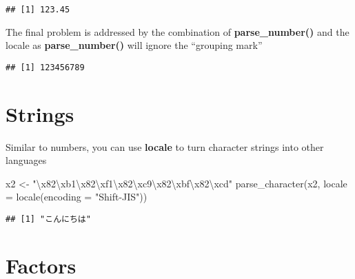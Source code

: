 \documentclass[
]{article}
\newenvironment{Shaded}{\begin{snugshade}}{\end{snugshade}}
\newcommand{\AttributeTok}[1]{\textcolor[rgb]{0.77,0.63,0.00}{#1}}
\newcommand{\FunctionTok}[1]{\textcolor[rgb]{0.00,0.00,0.00}{#1}}
\newcommand{\NormalTok}[1]{#1}
\newcommand{\OtherTok}[1]{\textcolor[rgb]{0.56,0.35,0.01}{#1}}
\newcommand{\SpecialCharTok}[1]{\textcolor[rgb]{0.00,0.00,0.00}{#1}}
\newcommand{\StringTok}[1]{\textcolor[rgb]{0.31,0.60,0.02}{#1}}
\begin{document}
\begin{verbatim}
## [1] 123.45
\end{verbatim}

The final problem is addressed by the combination of
\textbf{parse\_number()} and the locale as \textbf{parse\_number()} will
ignore the ``grouping mark''

\begin{Shaded}
\end{Shaded}

\begin{verbatim}
## [1] 123456789
\end{verbatim}

\hypertarget{strings}{%
\section{\texorpdfstring{\textbf{Strings}}{Strings}}\label{strings}}

Similar to numbers, you can use \textbf{locale} to turn character
strings into other languages

\begin{Shaded}
\begin{Highlighting}[]
\NormalTok{x2 }\OtherTok{\textless{}{-}} \StringTok{"}\SpecialCharTok{\textbackslash{}x82\textbackslash{}xb1\textbackslash{}x82\textbackslash{}xf1\textbackslash{}x82\textbackslash{}xc9\textbackslash{}x82\textbackslash{}xbf\textbackslash{}x82\textbackslash{}xcd}\StringTok{"}
\FunctionTok{parse\_character}\NormalTok{(x2, }\AttributeTok{locale =} \FunctionTok{locale}\NormalTok{(}\AttributeTok{encoding =} \StringTok{"Shift{-}JIS"}\NormalTok{))}
\end{Highlighting}
\end{Shaded}

\begin{verbatim}
## [1] "こんにちは"
\end{verbatim}

\hypertarget{factors}{%
\section{\texorpdfstring{\textbf{Factors}}{Factors}}\label{factors}}
\end{document}
